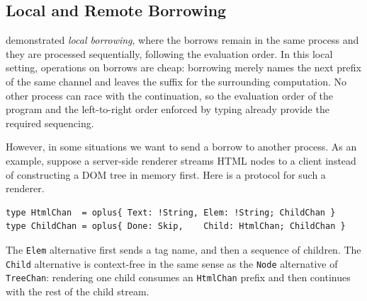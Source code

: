 \subsection{Local and Remote Borrowing}
\label{sec:local-remote-borr}

 demonstrated
 \emph{local borrowing}, where the borrows remain in the same
process and they are processed sequentially, following the evaluation order.
In this local setting, operations on borrows are
cheap: borrowing merely names the next prefix of the same channel and
leaves the suffix for the surrounding computation. No other process can
race with the continuation, so the evaluation order of the program and
the left-to-right order enforced by typing already provide the required
sequencing.

However, in some situations we want to send a borrow to
another process. As an example, suppose a server-side renderer streams
HTML nodes to a client instead of constructing a DOM tree in
memory first. Here is a protocol for such a renderer.
\begin{lstlisting}
type HtmlChan  = oplus{ Text: !String, Elem: !String; ChildChan }
type ChildChan = oplus{ Done: Skip,    Child: HtmlChan; ChildChan }
\end{lstlisting}
The \lstinline{Elem} alternative first sends a tag name, and then a sequence of children. The 
\lstinline{Child} alternative is context-free in the same sense as the
\lstinline{Node} alternative of \lstinline{TreeChan}: rendering one
child consumes an \lstinline{HtmlChan} prefix and then continues with
the rest of the child stream.

